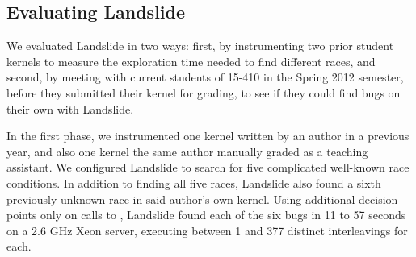 %

\subsection{Evaluating Landslide}

We evaluated Landslide in two ways: first, by instrumenting two prior student kernels to measure the exploration time needed to find different races, and second, by meeting with current students of 15-410 in the Spring 2012 semester, before they submitted their kernel for grading, to see if they could find bugs on their own with Landslide.

In the first phase, we instrumented one kernel written by an author in a previous year, and also one kernel the same author manually graded as a teaching assistant.
We configured Landslide to search for five complicated well-known race conditions.
In addition to finding all five races, Landslide also found a sixth previously unknown race in said author's own kernel.
Using additional decision points only on calls to , Landslide found each of the six bugs in 11 to 57 seconds on a 2.6 GHz Xeon server, executing between 1 and 377 distinct interleavings for each.

